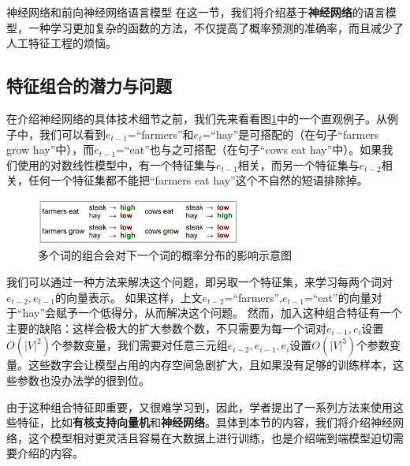 \documentclass[10pt,a4paper]{ctexart}
\makeatletter
\renewcommand{\section}{\@startsection{section}{1}{0mm}
  {-\baselineskip}{0.5\baselineskip}{\bf\leftline}}
\makeatother
\begin{document}

\section{神经网络和前向神经网络语言模型}
在这一节，我们将介绍基于\textbf{神经网络}的语言模型，一种学习更加复杂的函数的方法，不仅提高了概率预测的准确率，而且减少了人工特征工程的烦恼。

\subsection{特征组合的潜力与问题}
在介绍神经网络的具体技术细节之前，我们先来看看图\ref{fig:6}中的一个直观例子。从例子中，我们可以看到$e_{t-1}$=“farmers”和$e_t$=“hay”是可搭配的（在句子“farmers grow hay”中），而$e_{t-1}$=“eat”也与之可搭配（在句子“cows eat hay”中）。如果我们使用的对数线性模型中，有一个特征集与$e_{t-1}$相关，而另一个特征集与$e_{t-2}$相关，任何一个特征集都不能把“farmers eat hay”这个不自然的短语排除掉。

\begin{figure}[H]
\centering
\includegraphics[width=0.6\textwidth]{fig6.png}
\caption{多个词的组合会对下一个词的概率分布的影响示意图}
\label{fig:6}
\end{figure}

我们可以通过一种方法来解决这个问题，即另取一个特征集，来学习每两个词对$e_{t-2},e_{t-1}$的向量表示。
如果这样，上文$e_{t-2}$=“farmers”,$e_{t-1}$=“eat”的向量对于“hay”会赋予一个低得分，从而解决这个问题。
然而，加入这种组合特征有一个主要的缺陷：这样会极大的扩大参数个数，不只需要为每一个词对$e_{i-1},e_i$设置$O(|V|^2)$个参数变量，我们需要对任意三元组$e_{i-2},e_{i-1},e_i$设置$O(|V|^3)$个参数变量。这些数字会让模型占用的内存空间急剧扩大，且如果没有足够的训练样本，这些参数也没办法学的很到位。

由于这种组合特征即重要，又很难学习到，因此，学者提出了一系列方法来使用这些特征，比如\textbf{有核支持向量机}\cite{cortes1995support}和\textbf{神经网络}\cite{rumelhart1988learning,goldberg2016primer}。具体到本节的内容，我们将介绍神经网络，这个模型相对更灵活且容易在大数据上进行训练，也是介绍端到端模型迫切需要介绍的内容。
\end{document}
